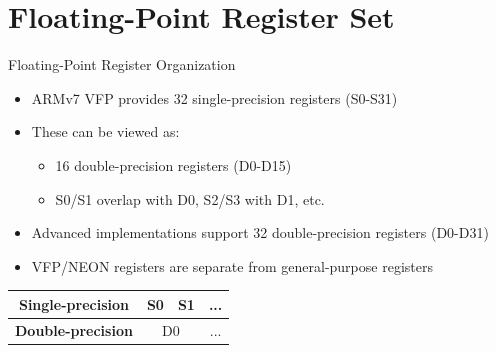 \documentclass[aspectratio=169]{beamer}
\begin{document}
\section{Floating-Point Register Set}
\begin{frame}
    \sectionpage
\end{frame}

\begin{frame}{Floating-Point Register Organization}
    \begin{itemize}
    \item ARMv7 VFP provides 32 single-precision registers (S0-S31)
    \item These can be viewed as:
    \begin{itemize}
    \item 16 double-precision registers (D0-D15)
    \item S0/S1 overlap with D0, S2/S3 with D1, etc.
    \end{itemize}
    \item Advanced implementations support 32 double-precision registers (D0-D31)
    \item VFP/NEON registers are separate from general-purpose registers
    \end{itemize}
    \begin{center}
    \begin{tabular}{|c|c|c|c|}
    \hline
    \textbf{Single-precision} & S0 & S1 & ... \\ %
    \hline
    \textbf{Double-precision} & \multicolumn{2}{|c|}{D0} & ... \\ %
    \hline
    \end{tabular}
    \end{center}
\end{frame}
\end{document}
